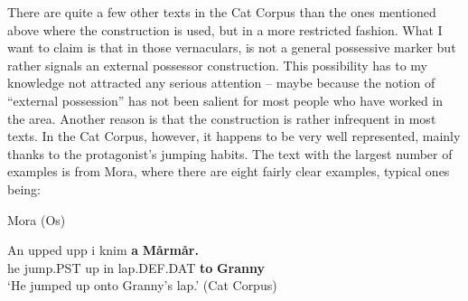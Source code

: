 
There are quite a few other texts in the Cat Corpus than the ones mentioned above where the construction is used, but in a more restricted fashion. What I want to claim is that in those vernaculars, is not a general possessive marker but rather signals an external possessor construction. This possibility has to my knowledge not attracted any serious attention – maybe because the notion of “external possession” has not been salient for most people who have worked in the area. Another reason is that the construction is rather infrequent in most texts. In the Cat Corpus, however, it happens to be very well represented, mainly thanks to the protagonist’s jumping habits. The text with the largest number of examples is from Mora, where there are eight fairly clear examples, typical ones being:


\item 

\label{bkm:Ref137369958}Mora (Os)



\item 


 \ea\label{}
\gll An  upped  upp  i  knim  \textbf{a} \textbf{Mårmår.}\\


he  jump.PST  up  in  lap.DEF.DAT  \textbf{to} \textbf{Granny}\\

\glt ‘He jumped up onto Granny’s lap.’ (Cat Corpus)

\z

\item 



